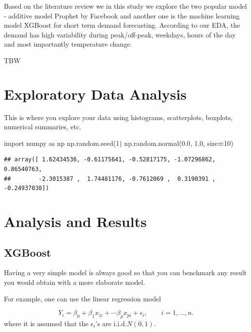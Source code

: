 \documentclass[mstat,12pt]{unswthesis}
\newenvironment{Shaded}{\begin{snugshade}}{\end{snugshade}}
\newcommand{\DecValTok}[1]{\textcolor[rgb]{0.00,0.00,0.81}{#1}}
\newcommand{\FloatTok}[1]{\textcolor[rgb]{0.00,0.00,0.81}{#1}}
\newcommand{\ImportTok}[1]{#1}
\newcommand{\NormalTok}[1]{#1}
\newcommand{\OperatorTok}[1]{\textcolor[rgb]{0.81,0.36,0.00}{\textbf{#1}}}
\begin{document}
Based on the literature review we in this study we explore the two
popular model - additive model Prophet by Facebook and another one is
the machine learning model XGBoost for short term demand forecasting.
According to our EDA, the demand has high variability during
peak/off-peak, weekdays, hours of the day and most importantly
temperature change.

TBW

\chapter{Exploratory Data Analysis}\label{exploratory-data-analysis}

This is where you explore your data using histograms, scatterplots,
boxplots, numerical summaries, etc.

\begin{Shaded}
\begin{Highlighting}[]
\ImportTok{import}\NormalTok{ numpy }\ImportTok{as}\NormalTok{ np}
\NormalTok{np.random.seed(}\DecValTok{1}\NormalTok{)}
\NormalTok{np.random.normal(}\FloatTok{0.0}\NormalTok{, }\FloatTok{1.0}\NormalTok{, size}\OperatorTok{=}\DecValTok{10}\NormalTok{)}
\end{Highlighting}
\end{Shaded}

\begin{verbatim}
## array([ 1.62434536, -0.61175641, -0.52817175, -1.07296862,  0.86540763,
##        -2.3015387 ,  1.74481176, -0.7612069 ,  0.3190391 , -0.24937038])
\end{verbatim}

\chapter{Analysis and Results}\label{analysis-and-results}

\section{XGBoost}\label{xgboost}

Having a very simple model is always good so that you can benchmark any
result you would obtain with a more elaborate model.

\bigskip

For example, one can use the linear regression model

\[
Y_i = \beta_0 + \beta_1 x_{1i} + \cdots \beta_p x_{pi} + \epsilon_i, \qquad i=1,\ldots,n.
\] where it is assumed that the \(\epsilon_i\)'s are i.i.d.\(N(0,1)\).
\end{document}
